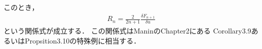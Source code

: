 \documentclass[dvipdfmx,12pt,a4paper,uplatex]{jsarticle}
\theoremstyle{plain}
\theoremstyle{definition}
\begin{document}
このとき，
\begin{align}
R_n = 
\frac{2}{2n+1}
\frac{\delta F_{n+1}}{\delta u}
\end{align}
という関係式が成立する．
この関係式はManin\cite{Manin}のChapter2にある
Corollary3.9あるいはPropsition3.10の特殊例に相当する．
\end{document}
